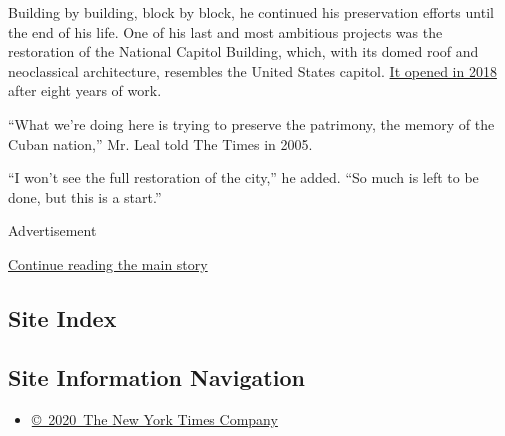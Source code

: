 Building by building, block by block, he continued his preservation
efforts until the end of his life. One of his last and most ambitious
projects was the restoration of the National Capitol Building, which,
with its domed roof and neoclassical architecture, resembles the United
States capitol.
\href{https://www.reuters.com/article/us-cuba-capitol/cubas-capitol-reopens-after-years-of-restoration-idUSKCN1GD6L1}{It
opened in 2018} after eight years of work.

``What we're doing here is trying to preserve the patrimony, the memory
of the Cuban nation,'' Mr. Leal told The Times in 2005.

``I won't see the full restoration of the city,'' he added. ``So much is
left to be done, but this is a start.''

Advertisement

\protect\hyperlink{after-bottom}{Continue reading the main story}

\hypertarget{site-index}{%
\subsection{Site Index}\label{site-index}}

\hypertarget{site-information-navigation}{%
\subsection{Site Information
Navigation}\label{site-information-navigation}}

\begin{itemize}
\tightlist
\item
  \href{https://help.nytimes3xbfgragh.onion/hc/en-us/articles/115014792127-Copyright-notice}{©~2020~The
  New York Times Company}
\end{itemize}

